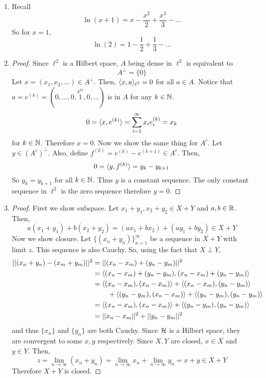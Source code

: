\begin{enumerate}
\item Recall
	\[ \ln(x+1) = x-\dfrac{x^2}{2}+\dfrac{x^3}{3} - \ldots \]
	So for $x=1$,
	\[ \ln(2) = 1-\dfrac 12+\dfrac 13 - \ldots \]

\item \begin{proof}
	Since $\ell^2$ is a Hilbert space, $A$ being dense in $\ell^2$ is equivalent to
		\[ A^\perp = \{ 0 \} \]
	Let $x = (x_1,x_2,\ldots) \in A^\perp$. Then, $\langle x,a \rangle_{\ell^2}=0$ for all $a \in A$. Notice that $a=e^{(k)} = (0,\ldots,0,\overset{k^{th}}{1},0,\ldots)$ is in $A$ for any $k \in \mathbb{N}$. 
		\[ 0 = \langle x,e^{(k)} \rangle = \sum_{i=1}^\infty x_i e^{(k)}_i = x_k\]
	for $k\in \mathbb{N}$. Therefore $x=0$. Now we show the same thing for $A^c$. Let $y \in (A^c)^\perp$. Also, define $f^{(k)}=e^{(k)} - e^{(k+1)} \in A^c$. Then,
		\[ 0 = \langle y,f^{(k)} \rangle = y_k-y_{k+1} \]
	So $y_k=y_{k+1}$ for all $k \in \mathbb{N}$. Thus $y$ is a constant sequence. The only constant sequence in $\ell^2$ is the zero sequence therefore $y=0$.
\end{proof}

\item \begin{proof}
	First we show subspace. Let $x_1+y_1,x_2+y_2 \in X+Y$ and $a,b \in \mathbb{R}$. Then,
		\[ a(x_1+y_1) + b(x_2+y_2) = (ax_1 + bx_2) + (ay_1+by_2) \in X + Y \]
	Now we show closure. Let $\{(x_n+y_n)\}_{n=1}^\infty$ be a sequence in $X+Y$ with limit $z$. This sequence is also Cauchy. So, using the fact that $X \perp Y$,
		\begin{align*}
			||(x_n+y_n)-(x_m+y_m)||^2 &= ||(x_n-x_m) + (y_n-y_m)||^2 \\
			&= \langle (x_n-x_m)+(y_n-y_m),(x_n-x_m)+(y_n-y_m)\rangle \\
			&= \langle (x_n-x_m),(x_n-x_m)\rangle + \langle (x_n-x_m),(y_n-y_m)\rangle \\
			&\hspace{5ex}+ \langle(y_n-y_m),(x_n-x_m)\rangle + \langle (y_n-y_m),(y_n-y_m)\rangle \\
			&= \langle (x_n-x_m),(x_n-x_m) \rangle + \langle(y_n-y_m),(y_n-y_m) \rangle \\
			&=||x_n-x_m||^2 + ||y_n-y_m||^2  
		\end{align*}
	and thus $\{x_n\}$ and $\{y_n\}$ are both Cauchy. Since $\mathcal{H}$ is a Hilbert space, they are convergent to some $x,y$ respectively. Since $X,Y$ are closed, $x \in X$ and $y \in Y$. Then,
		\[ z = \lim_{n \to \infty} (x_n+y_n) = \lim_{n\to\infty}x_n + \lim_{n\to\infty}y_n = x+y \in X + Y \]
	Therefore $X +Y$ is closed.			
\end{proof}


\end{enumerate}
